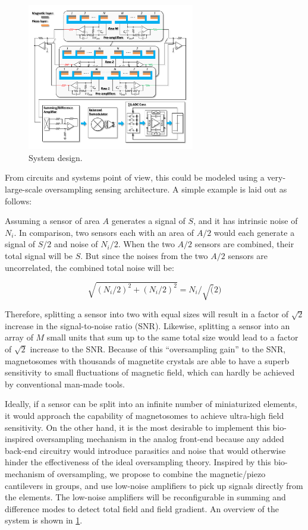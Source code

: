 \begin{figure}
\centering
\includegraphics[width=0.65\textwidth]{System}
\caption{System design.}
\label{fig:system}
\end{figure}

From circuits and systems point of view, this could be modeled using a very-large-scale oversampling sensing architecture. A simple example is laid out as follows: 

Assuming a sensor of area $A$ generates a signal of $S$, and it has intrinsic noise of $N_i$. In comparison, two sensors each with an area of $A/2$ would each generate a signal of $S/2$ and noise of $N_i/2$. When the two $A/2$ sensors are combined, their total signal will be $S$. But since the noises from the two $A/2$ sensors are uncorrelated, the combined total noise will be:

$$\sqrt{(N_i/2)^2+(N_i/2)^2} = N_i/\sqrt(2) $$

Therefore, splitting a sensor into two with equal sizes will result in a factor of $\sqrt{2}$ increase in the signal-to-noise ratio (SNR). Likewise, splitting a sensor into an array of $M$ small units that sum up to the same total size would lead to a factor of $\sqrt{2}$ increase to the SNR. Because of this “oversampling gain” to the SNR, magnetosomes with thousands of magnetite crystals are able to have a superb sensitivity to small fluctuations of magnetic field, which can hardly be achieved by conventional man-made tools. 

Ideally, if a sensor can be split into an infinite number of miniaturized elements, it would approach the capability of magnetosomes to achieve ultra-high field sensitivity. On the other hand, it is the most desirable to implement this bio-inspired oversampling mechanism in the analog front-end because any added back-end circuitry would introduce parasitics and noise that would otherwise hinder the effectiveness of the ideal oversampling theory. Inspired by this bio-mechanism of oversampling, we propose to combine the magnetic/piezo cantilevers in groups, and use low-noise amplifiers to pick up signals directly from the elements. The low-noise amplifiers will be reconfigurable in summing and difference modes to detect total field and field gradient. An overview of the system is shown in \ref{fig:system}.

